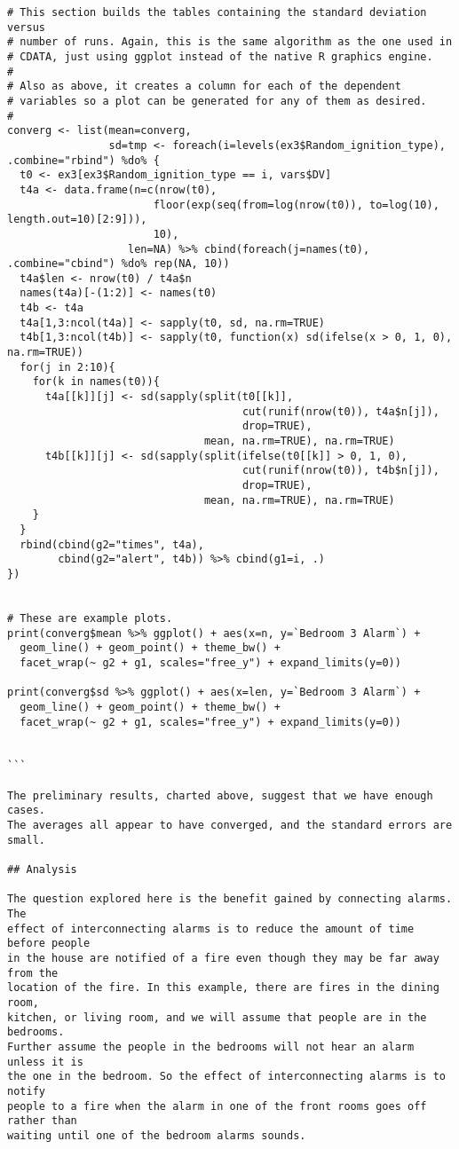\begin{lstlisting}[basicstyle=\scriptsize]
# This section builds the tables containing the standard deviation versus
# number of runs. Again, this is the same algorithm as the one used in
# CDATA, just using ggplot instead of the native R graphics engine.
#
# Also as above, it creates a column for each of the dependent
# variables so a plot can be generated for any of them as desired.
#
converg <- list(mean=converg,
                sd=tmp <- foreach(i=levels(ex3$Random_ignition_type), .combine="rbind") %do% {
  t0 <- ex3[ex3$Random_ignition_type == i, vars$DV]
  t4a <- data.frame(n=c(nrow(t0),
                       floor(exp(seq(from=log(nrow(t0)), to=log(10), length.out=10)[2:9])),
                       10),
                   len=NA) %>% cbind(foreach(j=names(t0), .combine="cbind") %do% rep(NA, 10))
  t4a$len <- nrow(t0) / t4a$n
  names(t4a)[-(1:2)] <- names(t0)
  t4b <- t4a
  t4a[1,3:ncol(t4a)] <- sapply(t0, sd, na.rm=TRUE)
  t4b[1,3:ncol(t4b)] <- sapply(t0, function(x) sd(ifelse(x > 0, 1, 0), na.rm=TRUE))
  for(j in 2:10){
    for(k in names(t0)){
      t4a[[k]][j] <- sd(sapply(split(t0[[k]],
                                     cut(runif(nrow(t0)), t4a$n[j]),
                                     drop=TRUE),
                               mean, na.rm=TRUE), na.rm=TRUE)
      t4b[[k]][j] <- sd(sapply(split(ifelse(t0[[k]] > 0, 1, 0),
                                     cut(runif(nrow(t0)), t4b$n[j]),
                                     drop=TRUE),
                               mean, na.rm=TRUE), na.rm=TRUE)
    }
  }
  rbind(cbind(g2="times", t4a),
        cbind(g2="alert", t4b)) %>% cbind(g1=i, .)
})


# These are example plots.
print(converg$mean %>% ggplot() + aes(x=n, y=`Bedroom 3 Alarm`) +
  geom_line() + geom_point() + theme_bw() +
  facet_wrap(~ g2 + g1, scales="free_y") + expand_limits(y=0))

print(converg$sd %>% ggplot() + aes(x=len, y=`Bedroom 3 Alarm`) +
  geom_line() + geom_point() + theme_bw() +
  facet_wrap(~ g2 + g1, scales="free_y") + expand_limits(y=0))


```

The preliminary results, charted above, suggest that we have enough cases.
The averages all appear to have converged, and the standard errors are
small.

## Analysis

The question explored here is the benefit gained by connecting alarms. The
effect of interconnecting alarms is to reduce the amount of time before people
in the house are notified of a fire even though they may be far away from the
location of the fire. In this example, there are fires in the dining room,
kitchen, or living room, and we will assume that people are in the bedrooms.
Further assume the people in the bedrooms will not hear an alarm unless it is
the one in the bedroom. So the effect of interconnecting alarms is to notify
people to a fire when the alarm in one of the front rooms goes off rather than
waiting until one of the bedroom alarms sounds.


\end{lstlisting}
